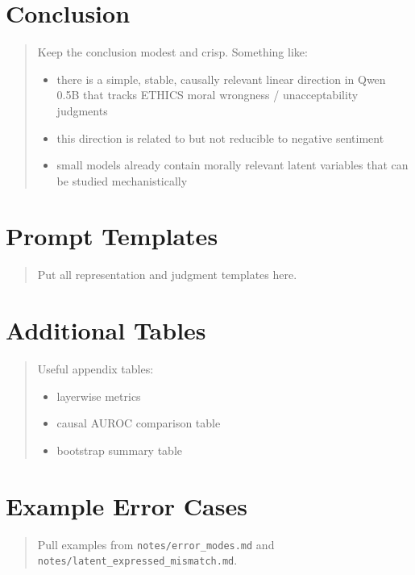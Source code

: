 \documentclass[11pt]{article}
\newcommand{\draftnote}[1]{%
  \begin{quote}\footnotesize\color{gray}#1\end{quote}%
}
\begin{document}
\section{Conclusion}
\draftnote{
Keep the conclusion modest and crisp.
Something like:
\begin{itemize}[leftmargin=1.5em]
    \item there is a simple, stable, causally relevant linear direction in Qwen 0.5B that tracks ETHICS moral wrongness / unacceptability judgments
    \item this direction is related to but not reducible to negative sentiment
    \item small models already contain morally relevant latent variables that can be studied mechanistically
\end{itemize}
}

\appendix

\section{Prompt Templates}
\draftnote{
Put all representation and judgment templates here.
}

\section{Additional Tables}
\draftnote{
Useful appendix tables:
\begin{itemize}[leftmargin=1.5em]
    \item layerwise metrics
    \item causal AUROC comparison table
    \item bootstrap summary table
\end{itemize}
}

\section{Example Error Cases}
\draftnote{
Pull examples from \texttt{notes/error\_modes.md} and \texttt{notes/latent\_expressed\_mismatch.md}.
}



\end{document}
